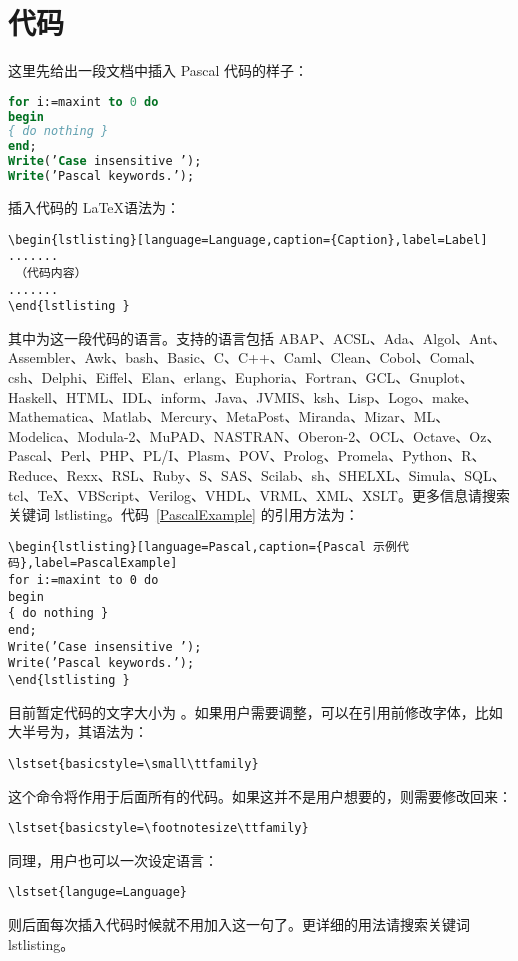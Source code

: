 \section{代码}
这里先给出一段文档中插入 Pascal 代码的样子：
\begin{lstlisting}[language=Pascal,caption={Pascal 代码示例},label=PascalExample]
for i:=maxint to 0 do
begin
{ do nothing }
end;
Write(’Case insensitive ’);
Write(’Pascal keywords.’);
\end{lstlisting}

插入代码的 \LaTeX 语法为：
\begin{lstlisting}[language={[LaTeX]TeX},caption={插入代码的语法}]
\begin{lstlisting}[language=Language,caption={Caption},label=Label]
.......
 （代码内容）
.......
\end{lstlisting }\end{lstlisting}

其中为这一段代码的语言。支持的语言包括 ABAP、ACSL、Ada、Algol、Ant、Assembler、Awk、bash、Basic、C、C++、Caml、Clean、Cobol、Comal、csh、Delphi、Eiffel、Elan、erlang、Euphoria、Fortran、GCL、Gnuplot、Haskell、HTML、IDL、inform、Java、JVMIS、ksh、Lisp、Logo、make、Mathematica、Matlab、Mercury、MetaPost、Miranda、Mizar、ML、Modelica、Modula-2、MuPAD、NASTRAN、Oberon-2、OCL、Octave、Oz、Pascal、Perl、PHP、PL/I、Plasm、POV、Prolog、Promela、Python、R、Reduce、Rexx、RSL、Ruby、S、SAS、Scilab、sh、SHELXL、Simula、SQL、tcl、TeX、VBScript、Verilog、VHDL、VRML、XML、XSLT。更多信息请搜索关键词 lstlisting。代码~\ref{PascalExample} 的引用方法为：
\begin{lstlisting}[language={[LaTeX]TeX},caption={插入代码示例}]
\begin{lstlisting}[language=Pascal,caption={Pascal 示例代码},label=PascalExample]
for i:=maxint to 0 do
begin
{ do nothing }
end;
Write(’Case insensitive ’);
Write(’Pascal keywords.’);
\end{lstlisting }
\end{lstlisting}

目前暂定代码的文字大小为 。如果用户需要调整，可以在引用前修改字体，比如大半号为，其语法为：
\begin{lstlisting}[language={[LaTeX]TeX}]
\lstset{basicstyle=\small\ttfamily}
\end{lstlisting}
这个命令将作用于后面所有的代码。如果这并不是用户想要的，则需要修改回来：
\begin{lstlisting}[language={[LaTeX]TeX}]
\lstset{basicstyle=\footnotesize\ttfamily}
\end{lstlisting}
同理，用户也可以一次设定语言：
\begin{lstlisting}[language={[LaTeX]TeX}]
\lstset{languge=Language}
\end{lstlisting}
则后面每次插入代码时候就不用加入这一句了。更详细的用法请搜索关键词 lstlisting。

